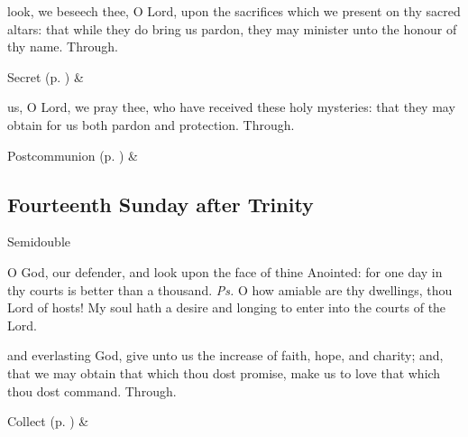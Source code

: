 
\secret
{} look, we beseech thee, O Lord, upon the sacrifices which we present on thy sacred altars: that while they do bring us pardon, they may minister unto the honour of thy name. Through.
\begin{rubric}
     Secret  (p. \pageref{SPSaints}) \&  
\end{rubric}


\postcommunion
{} us, O Lord, we pray thee, who have received these holy mysteries: that they may obtain for us both pardon and protection. Through.


\begin{rubric}
     Postcommunion  (p. \pageref{SPSaints}) \&  
\end{rubric}

\subsection{Fourteenth Sunday after Trinity}
\begin{inhead}
{Semidouble}
\end{inhead}


\introit
{} O God, our defender, and look upon the face of thine Anointed: for one day in thy courts is better than a thousand. \textit{Ps.} O how amiable are thy dwellings, thou Lord of hosts! My soul hath a desire and longing to enter into the courts of the Lord.

\collect
{} and everlasting God, give unto us the increase of faith, hope, and charity; and, that we may obtain that which thou dost promise, make us to love that which thou dost command. Through.
\begin{rubric}
     Collect  (p. \pageref{SPSaints}) \&  
\end{rubric}

